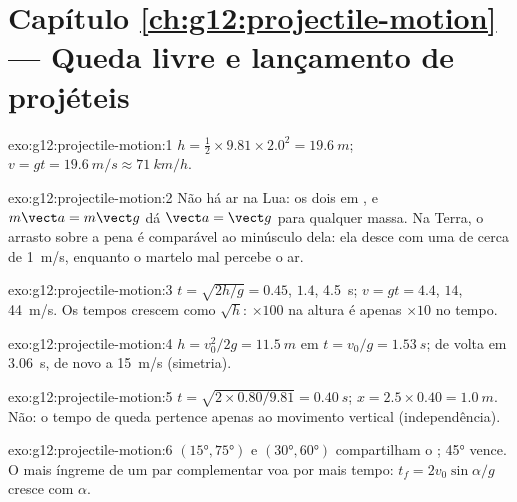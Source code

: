 \section*{Capítulo \ref{ch:g12:projectile-motion} --- Queda livre e lançamento de projéteis}

\begin{solution}{exo:g12:projectile-motion:1}
$h = \tfrac12 \times 9.81 \times 2.0^2 = \qty{19.6}{m}$;
$v = gt = \qty{19.6}{m/s} \approx \qty{71}{km/h}$.
\end{solution}

\begin{solution}{exo:g12:projectile-motion:2}
Não há ar na Lua: os dois em , e $m\vect a = m\vect g$ dá
$\vect a = \vect g$ para qualquer massa. Na Terra, o arrasto sobre a pena
é comparável ao  minúsculo dela: ela desce com uma 
de cerca de \qty{1}{m/s}, enquanto o martelo mal percebe o ar.
\end{solution}

\begin{solution}{exo:g12:projectile-motion:3}
$t = \sqrt{2h/g} = 0.45$, $1.4$, \qty{4.5}{s};
$v = gt = 4.4$, $14$, \qty{44}{m/s}. Os tempos crescem como $\sqrt h$:
$\times 100$ na altura é apenas $\times 10$ no tempo.
\end{solution}

\begin{solution}{exo:g12:projectile-motion:4}
$h = v_0^2/2g = \qty{11.5}{m}$ em $t = v_0/g = \qty{1.53}{s}$; de volta
em \qty{3.06}{s}, de novo a \qty{15}{m/s} (simetria).
\end{solution}

\begin{solution}{exo:g12:projectile-motion:5}
$t = \sqrt{2 \times 0.80/9.81} = \qty{0.40}{s}$;
$x = 2.5 \times 0.40 = \qty{1.0}{m}$. Não: o tempo de queda pertence
apenas ao movimento vertical (independência).
\end{solution}

\begin{solution}{exo:g12:projectile-motion:6}
$(\ang{15},\ang{75})$ e $(\ang{30},\ang{60})$ compartilham o ;
\ang{45} vence. O mais íngreme de um par complementar voa por mais tempo:
$t_f = 2v_0\sin\alpha/g$ cresce com $\alpha$.
\end{solution}

